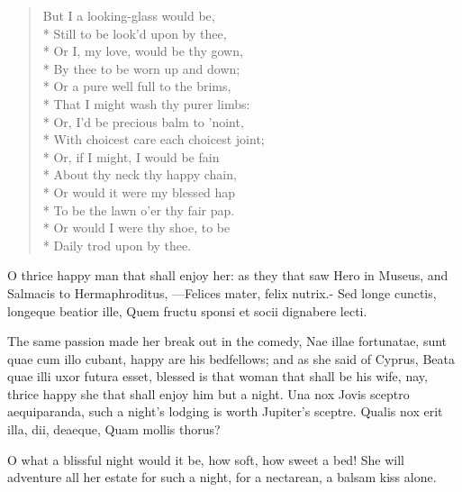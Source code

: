 \begin{verse}
But I a looking-glass would be,\\*
Still to be look'd upon by thee,\\*
Or I, my love, would be thy gown,\\*
By thee to be worn up and down;\\*
Or a pure well full to the brims,\\*
That I might wash thy purer limbs:\\*
Or, I'd be precious balm to 'noint,\\*
With choicest care each choicest joint;\\*
Or, if I might, I would be fain\\*
About thy neck thy happy chain,\\*
Or would it were my blessed hap\\*
To be the lawn o'er thy fair pap.\\*
Or would I were thy shoe, to be\\*
Daily trod upon by thee.
\end{verse}

O thrice happy man that shall enjoy her: as they that saw Hero in
Museus, and Salmacis to Hermaphroditus,
---Felices mater, \etc{} felix nutrix.-
Sed longe cunctis, longeque beatior ille,
Quem fructu sponsi et socii dignabere lecti.

The same passion made her break out in the comedy, Nae illae
fortunatae, sunt quae cum illo cubant, happy are his bedfellows; and as
she said of Cyprus, Beata quae illi uxor futura esset, blessed is
that woman that shall be his wife, nay, thrice happy she that shall
enjoy him but a night. Una nox Jovis sceptro aequiparanda, such a
night's lodging is worth Jupiter's sceptre.
Qualis nox erit illa, dii, deaeque,
Quam mollis thorus?

O what a blissful night would it be, how soft, how sweet a bed! She
will adventure all her estate for such a night, for a nectarean, a
balsam kiss alone.

